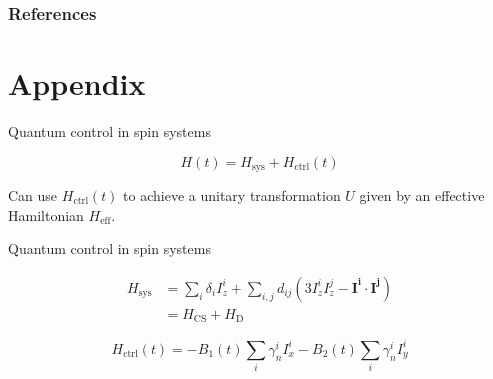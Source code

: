 \documentclass{beamer}
\begin{document}
\begin{frame}[allowframebreaks]
\frametitle{References}

\printbibliography

\end{frame}
















\section{Appendix}


\begin{frame}{Quantum control in spin systems}

\[
    H(t) = H_{\text{sys}} + H_{\text{ctrl}}(t)
\]

Can use $H_{\text{ctrl}}(t)$ to achieve
a unitary transformation $U$ given by an effective Hamiltonian $H_\text{eff}$.

\begin{figure}
\centering

\end{figure}

\end{frame}


\begin{frame}{Quantum control in spin systems}


\begin{align*}
    H_{\text{sys}} &= \sum_i \delta_i I_z^i + \sum_{i,j} d_{ij} \left( 3I_z^iI_z^j - \mathbf{I^i} \cdot \mathbf{I^j} \right) \\
        &= H_\text{CS} + H_\text{D}
\end{align*}

\[
    H_{\text{ctrl}}(t) = -B_1(t) \sum_i \gamma_n^i I_x^i -B_2(t) \sum_i \gamma_n^i I_y^i
\]

\end{frame}
\end{document}
